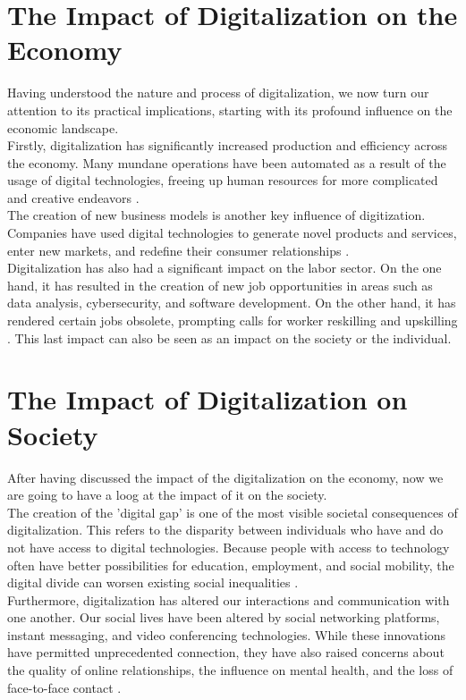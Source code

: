 \documentclass[12pt]{article}
\begin{document}
\section{The Impact of Digitalization on the Economy}
Having understood the nature and process of digitalization, we now turn our attention to its practical implications, starting with its profound influence on the economic landscape. \\
Firstly, digitalization has significantly increased production and efficiency across the economy. Many mundane operations have been automated as a result of the usage of digital technologies, freeing up human resources for more complicated and creative endeavors \cite{Parviainen.2017}. \\
The creation of new business models is another key influence of digitization. Companies have used digital technologies to generate novel products and services, enter new markets, and redefine their consumer relationships \cite{Tschandl.2019}. \\
Digitalization has also had a significant impact on the labor sector. On the one hand, it has resulted in the creation of new job opportunities in areas such as data analysis, cybersecurity, and software development. On the other hand, it has rendered certain jobs obsolete, prompting calls for worker reskilling and upskilling \cite{Parviainen.2017}. This last impact can also be seen as an impact on the society or the individual.

\section{The Impact of Digitalization on Society}
After having discussed the impact of the digitalization on the economy, now we are going to have a loog at the impact of it on the society. \\
The creation of the 'digital gap' is one of the most visible societal consequences of digitalization. This refers to the disparity between individuals who have and do not have access to digital technologies. Because people with access to technology often have better possibilities for education, employment, and social mobility, the digital divide can worsen existing social inequalities \cite{Jamil.2021}. \\
Furthermore, digitalization has altered our interactions and communication with one another. Our social lives have been altered by social networking platforms, instant messaging, and video conferencing technologies. While these innovations have permitted unprecedented connection, they have also raised concerns about the quality of online relationships, the influence on mental health, and the loss of face-to-face contact \cite{HenningHummert.2018}.
\end{document}
